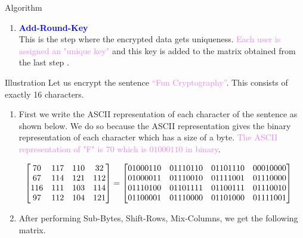 \documentclass{beamer}
\begin{document}
\begin{frame}[allowframebreaks]{Algorithm}
\begin{enumerate}
    \vspace{5mm}

  \item \textbf{\textcolor{blue}{Add-Round-Key}}\\
This is the step where the encrypted data gets uniqueness. \textcolor{violet}{Each user is assigned an "unique key"} and this key is added to the matrix obtained from the last step \cite{aes}.
  \end{enumerate}
\end{frame}

\begin{frame}[allowframebreaks]{Illustration}
  Let us encrypt the sentence \textcolor{violet}{``Fun Cryptography''}. This consists of exactly 16 characters.\vspace{2mm}

\begin{enumerate}
\item First we write the ASCII representation of each character of the sentence as shown below. We do so because the ASCII representation gives the binary representation of each character which has a size of a byte. \textcolor{violet}{The ASCII representation of "F" is \(70\) which is \(01000110\) in binary}.\vspace{2mm}

  \[\hspace{-3mm} \begin{bmatrix}
      70 & 117 & 110 & 32 \\
      67 & 114 & 121 & 112\\
      116 & 111 & 103 & 114 \\
      97 & 112 & 104 & 121
    \end{bmatrix}=
    \begin{bmatrix}
      01000110 & 01110110 & 01101110 & 00010000 \\
      01000011 & 01110010 & 01111001 & 01110000\\
      01110100 & 01101111 & 01100111 & 01110010 \\
      01100001 & 01110000 & 01101000 & 01111001
    \end{bmatrix}
  \]
\item After performing Sub-Bytes, Shift-Rows, Mix-Columns, we get the following matrix.


\end{enumerate}
\end{frame}
\end{document}
